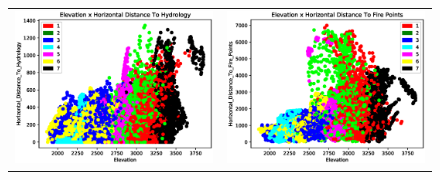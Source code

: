 \begin{figure}[htpb]
	\centering
	\begin{tabular}{cc}
		\includegraphics[scale=0.45]{figs/1.eps}	& \includegraphics[scale=0.45]{figs/2.eps}\\ 

\end{tabular}
\end{figure}
